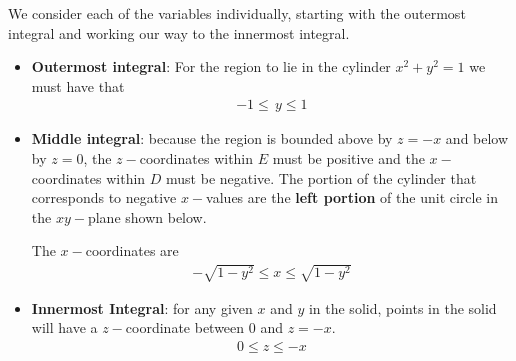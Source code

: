     \ifnum {} 
    {\color{DarkBlue} We consider each of the variables individually, starting with the outermost integral and working our way to the innermost integral. 
    \begin{itemize}
        \item \textbf{Outermost integral}: For the region to lie in the cylinder $x^2+y^2=1$ we must have that 
        \begin{align}
            -1 \le \, y \le 1 
        \end{align}
        \item \textbf{Middle integral}: because the region is bounded above by $z = -x$ and below by $z=0$, the $z-$coordinates within $E$ must be positive and the $x-$coordinates within $D$ must be negative. The portion of the cylinder that corresponds to negative $x-$values are the \textbf{left portion} of the unit circle in the $xy-$plane shown below. 
        \begin{center}     
        \end{center}         
        The $x-$coordinates are 
        \begin{align}
            -\sqrt{1-y^2} \le x \le \sqrt{1-y^2}
        \end{align}
        \item \textbf{Innermost Integral}: for any given $x$ and $y$ in the solid, points in the solid will have a $z-$coordinate between $0$ and $z=-x$. 
        \begin{align}
            0 \le z \le -x
        \end{align}
    \end{itemize}

}
